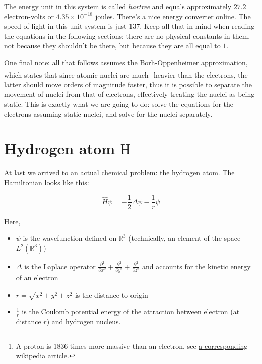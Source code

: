 \documentclass{article}
\newcommand{\molecule}[1]{\textrm{#1}}
\begin{document}
The energy unit in this system is called \href{https://en.wikipedia.org/wiki/Hartree}{\textit{hartree}} and equals approximately \(27.2\) electron-volts or \(4.35\times 10^{-18}\) joules. There's a \href{http://www.colby.edu/chemistry/PChem/Hartree.html}{nice energy converter online}. The speed of light in this unit system is just \(137\). Keep all that in mind when reading the equations in the following sections: there are no physical constants in them, not because they shouldn't be there, but because they are all equal to \(1\).

One final note: all that follows assumes the \href{https://en.wikipedia.org/wiki/Born\%E2\%80\%93Oppenheimer_approximation}{Borh-Oppenheimer approximation}, which states that since atomic nuclei are much\footnote{A proton is 1836 times more massive than an electron, see \href{https://en.wikipedia.org/wiki/Proton-to-electron_mass_ratio}{a corresponding wikipedia article}.} heavier than the electrons, the latter should move orders of magnitude faster, thus it is possible to separate the movement of nuclei from that of electrons, effectively treating the nuclei as being static. This is exactly what we are going to do: solve the equations for the electrons assuming static nuclei, and solve for the nuclei separately.

\newpage

\section{Hydrogen atom \(\molecule{H}\)}

At last we arrived to an actual chemical problem: the hydrogen atom. The Hamiltonian looks like this:

\begin{equation}
\hat H\psi = -\frac{1}{2} \Delta \psi - \frac{1}{r}\psi
\end{equation}

Here, 

\begin{itemize}
\item \(\psi\) is the wavefunction defined on \(\mathbb R^3\) (technically, an element of the space \(L^2(\mathbb R^3)\))
\item \(\Delta\) is the \href{https://en.wikipedia.org/wiki/Laplace_operator}{Laplace operator} \(\frac{\partial^2}{\partial x^2}+\frac{\partial^2}{\partial y^2}+\frac{\partial^2}{\partial z^2}\) and accounts for the kinetic energy of an electron
\item \(r=\sqrt{x^2+y^2+z^2}\) is the distance to origin
\item \(\frac{1}{r}\) is the \href{https://en.wikipedia.org/wiki/Electric_potential_energy}{Coulomb potential energy} of the attraction between electron (at distance \(r\)) and hydrogen nucleus.
\end{itemize}
\end{document}
